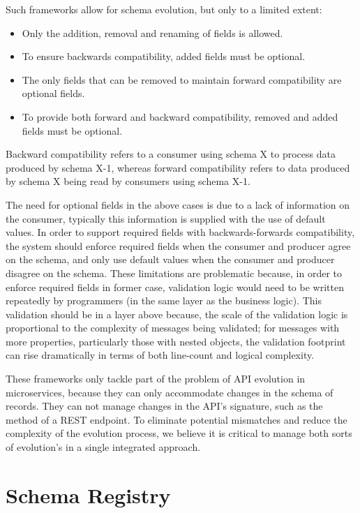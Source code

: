 Such frameworks allow for schema evolution, but only to a limited extent:
\begin{itemize}
    \item Only the addition, removal and renaming of fields is allowed.
    \item To ensure backwards compatibility, added fields must be optional.
    \item The only fields that can be removed to maintain forward compatibility are optional fields.
    \item To provide both forward and backward compatibility, removed and added fields must be optional.
\end{itemize}
Backward compatibility refers to a consumer using schema X to process data produced by schema X-1,
whereas forward compatibility refers to data produced by schema X being read by consumers using schema X-1.

The need for optional fields in the above cases is due to a lack of information on the consumer, typically this information is supplied with the use of default values.
In order to support required fields with backwards-forwards compatibility, the system should enforce required fields when the consumer and producer agree on the schema,
and only use default values when the consumer and producer disagree on the schema.
These limitations are problematic because, in order to enforce required fields in former case,
validation logic would need to be written repeatedly by programmers (in the same layer as the business logic).
This validation should be in a layer above because, the scale of the validation logic is proportional to the complexity of messages being validated;
for messages with more properties, particularly those with nested objects, the validation footprint can rise dramatically in terms of both line-count and logical complexity.

These frameworks only tackle part of the problem of API evolution in microservices,
because they can only accommodate changes in the schema of records.
They can not manage changes in the API's signature, such as the method of a REST endpoint.
To eliminate potential mismatches and reduce the complexity of the evolution process, we believe it is critical to manage both sorts of evolution's in a single integrated approach.

\section{Schema Registry} %
\label{sec:schema_registry}

